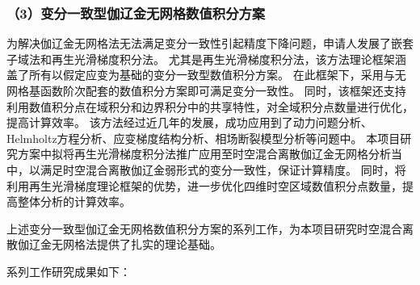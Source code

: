 \subsubsection*{\bfseries （3）变分一致型伽辽金无网格数值积分方案}
为解决伽辽金无网格法无法满足变分一致性引起精度下降问题，申请人发展了嵌套子域法和再生光滑梯度积分法。
尤其是再生光滑梯度积分法，该方法理论框架涵盖了所有以假定应变为基础的变分一致型数值积分方案。
在此框架下，采用与无网格基函数阶次配套的数值积分方案即可满足变分一致性。
同时，该框架还支持利用数值积分点在域积分和边界积分中的共享特性，对全域积分点数量进行优化，提高计算效率。
该方法经过近几年的发展，成功应用到了动力问题分析、Helmholtz方程分析、应变梯度结构分析、相场断裂模型分析等问题中。
本项目研究方案中拟将再生光滑梯度积分法推广应用至时空混合离散伽辽金无网格分析当中，以满足时空混合离散伽辽金弱形式的变分一致性，保证计算精度。
同时，将利用再生光滑梯度理论框架的优势，进一步优化四维时空区域数值积分点数量，提高整体分析的计算效率。

上述变分一致型伽辽金无网格数值积分方案的系列工作，为本项目研究时空混合离散伽辽金无网格法提供了扎实的理论基础。

系列工作研究成果如下：

